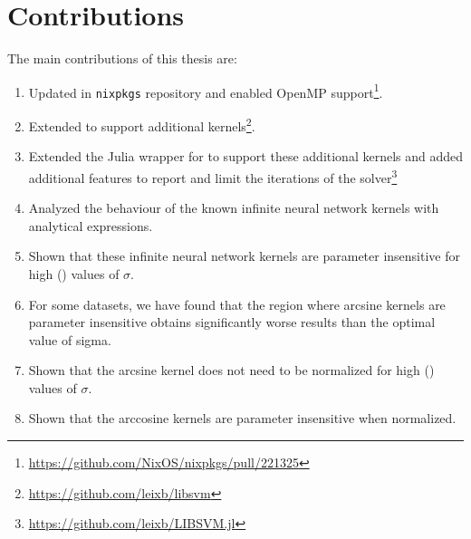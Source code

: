 


\section{Contributions}

The main contributions of this thesis are:
\begin{enumerate}
    \item Updated \libsvm in \texttt{nixpkgs} repository and enabled OpenMP support\footnote{\url{https://github.com/NixOS/nixpkgs/pull/221325}}.
    \item Extended \libsvm to support additional kernels\footnote{\url{https://github.com/leixb/libsvm}}.
    \item Extended the Julia wrapper for \libsvm to support these additional kernels and added additional
          features to report and limit the iterations of the solver\footnote{\url{https://github.com/leixb/LIBSVM.jl}}
    \item Analyzed the behaviour of the known infinite neural network kernels with analytical expressions.
    \item Shown that these infinite neural network kernels are parameter insensitive for high (\threshold) values of $\sigma$.
    \item For some datasets, we have found that the region where arcsine kernels are parameter insensitive obtains
          significantly worse results than the optimal value of sigma.
    \item Shown that the arcsine kernel does not need to be normalized for high (\threshold) values of $\sigma$.
    \item Shown that the arccosine kernels are parameter insensitive when normalized.
\end{enumerate}
